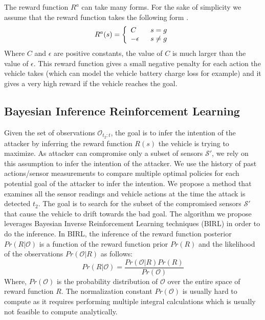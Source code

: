 \documentclass[letterpaper, 10 pt, conference]{ieeeconf}  %
\begin{document}
The reward function $R^a$ can take many forms. For the sake of simplicity we assume that the reward function takes the following form . 
  \begin{equation}
    R^a(s)=\left\{
                \begin{array}{ll}
                  C\hspace{2em} s = g\\
                  -\epsilon\hspace{1.6em} s \ne g
                \end{array}
              \right.
  \end{equation}
Where $C$ and $\epsilon$ are positive constants, the value of $C$ is much larger than the value of $\epsilon$. This reward function gives a small negative penalty for each action the vehicle takes (which can model the vehicle battery charge loss for example) and it gives a very high reward if the vehicle reaches the goal.
\subsection{Bayesian Inference Reinforcement Learning}
Given the set of observations $\mathcal{\mathcal{O}}_{t_2:t}$, the goal is to infer the intention of the attacker by inferring the reward function $R(s)$ the vehicle is trying to maximize. As attacker can compromise only a subset of sensors $\mathcal{S}'$, we rely on this assumption to infer the intention of the attacker. We use the history of past actions/sensor measurements to compare multiple optimal policies for each potential goal of the attacker to infer the intention. We propose a method that examines all the sensor readings and vehicle actions at the time the attack is detected $t_2$. The goal is to search for the subset of the compromised sensors $\mathcal{S}'$  that cause the vehicle to drift towards the bad goal. The algorithm we propose leverages Bayesian Inverse Reinforcement Learning techniques (BIRL)\cite{Ramachandran2007} in order to do the inference. In BIRL, the inference of the reward function posterior $Pr(R|\mathcal{O})$ is a function of the reward function prior $Pr(R)$ and the likelihood of the observations $Pr(\mathcal{O}|R)$ as follows:
\begin{equation} 
    Pr(R|\mathcal{O}) = \frac{Pr(\mathcal{O}|R)Pr(R)}{Pr(\mathcal{O})}
\end{equation}
Where, $Pr(\mathcal{O})$ is the probability distribution of $\mathcal{O}$ over the entire space of reward function $R$. The normalization constant $Pr(\mathcal{O})$ is usually hard to compute as it requires performing multiple integral calculations which is usually not feasible to compute analytically. 
\end{document}
